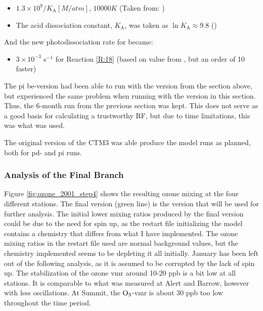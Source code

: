 \begin{itemize}
    \item $1.3\times10^9/K_\text{A} [M/atm]$, $10 000 K$ (Taken from: \cite{Brimblecombe1988TheSA})
    \item The acid dissociation constant, $K_\text{A}$, was taken as $\ln{K_\text{A}} \approx 9.8$ (\cite{Levanov})
\end{itemize}

And the new photodissociation rate for  became:

\begin{itemize}
    \item $3\times10^{-3}$ s$^{-1}$ for Reaction \ref{R:18} (based on value from \cite{CAO}, but an order of 10 faster)
\end{itemize}

The \acrshort{pi} \acrshort{be}-version had been able to run with the version from the section above, but experienced the same problem when running with the version in this section. Thus, the 6-month run from the previous section was kept. This does not serve as a good basis for calculating a trustworthy RF, but due to time limitations, this was what was used. 

\medskip

The original version of the CTM3 was able produce the model runs as planned, both for \acrshort{pd}- and \acrshort{pi} runs. 

\subsubsection{Analysis of the Final Branch}\label{sec:disc_finalBRanch}


Figure \ref{fig:ozone_2001_step4} shows the resulting ozone mixing at the four different stations. The final version (green line) is the version that will be used for further analysis. The initial lower mixing ratios produced by the final version could be due to the need for spin up, as the restart file initializing the model contains a chemistry that differs from what I have implemented. The ozone mixing ratios in the restart file used are normal background values, but the chemistry implemented seems to be depleting it all initially. January has been left out of the following analysis, as it is assumed to be corrupted by the lack of spin up. The stabilization of the ozone \acrshort{vmr} around 10-20 ppb is a bit low at all stations. It is comparable to what was measured at Alert and Barrow, however with less oscillations. At Summit, the $\mathrm{O_3}$-\acrshort{vmr} is about 30 ppb too low throughout the time period.


